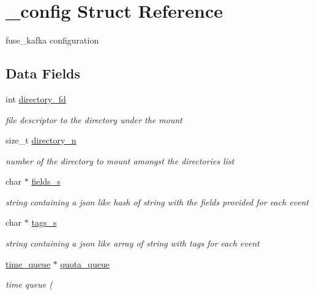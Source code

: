 \hypertarget{struct__config}{\section{\-\_\-config Struct Reference}
\label{struct__config}
}


fuse\-\_\-kafka configuration  


\subsection*{Data Fields}
\begin{DoxyCompactItemize}
\item 
\hypertarget{struct__config_a01ffc24a715f72975a6b72af990e72fa}{int \hyperlink{struct__config_a01ffc24a715f72975a6b72af990e72fa}{directory\-\_\-fd}}\label{struct__config_a01ffc24a715f72975a6b72af990e72fa}

\begin{DoxyCompactList}\small\item\em file descriptor to the directory under the mount \end{DoxyCompactList}\item 
\hypertarget{struct__config_a0b3e811f6c5e7037b3763da5d1b9b8d2}{size\-\_\-t \hyperlink{struct__config_a0b3e811f6c5e7037b3763da5d1b9b8d2}{directory\-\_\-n}}\label{struct__config_a0b3e811f6c5e7037b3763da5d1b9b8d2}

\begin{DoxyCompactList}\small\item\em number of the directory to mount amongst the directories list \end{DoxyCompactList}\item 
\hypertarget{struct__config_a1aba07f207e5a58583f1e0a9ac674454}{char $\ast$ \hyperlink{struct__config_a1aba07f207e5a58583f1e0a9ac674454}{fields\-\_\-s}}\label{struct__config_a1aba07f207e5a58583f1e0a9ac674454}

\begin{DoxyCompactList}\small\item\em string containing a json like hash of string with the fields provided for each event \end{DoxyCompactList}\item 
\hypertarget{struct__config_a863b76129d6ac5e58f319afef6960bad}{char $\ast$ \hyperlink{struct__config_a863b76129d6ac5e58f319afef6960bad}{tags\-\_\-s}}\label{struct__config_a863b76129d6ac5e58f319afef6960bad}

\begin{DoxyCompactList}\small\item\em string containing a json like array of string with tags for each event \end{DoxyCompactList}\item 
\hyperlink{structtime__queue}{time\-\_\-queue} $\ast$ \hyperlink{struct__config_a145aaea5a1685bb59a5187bb4f2c5829}{quota\-\_\-queue}
\begin{DoxyCompactList}\small\item\em time queue ( \end{DoxyCompactList}\end{DoxyCompactItemize}


